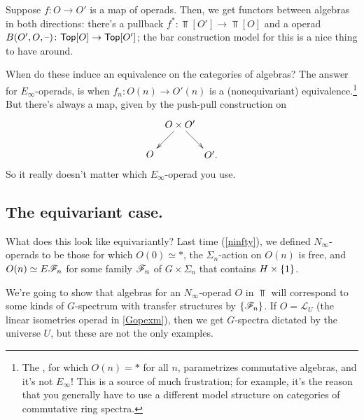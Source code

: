 Suppose $f\colon O\to O'$ is a map of operads. Then, we get functors between algebras in both directions: there's a
pullback $f^*\colon\Top[O']\to\Top[O]$ and a  operad $B(O',O,\text{--})\colon\mathsf{Top}[O]\to\mathsf{Top}[O']$;
the bar construction model for this is a nice thing to have around.

When do these induce an equivalence on the categories of algebras? The answer for $E_\infty$-operads,
is when $f_n\colon O(n)\to O'(n)$ is a (nonequivariant) equivalence.\footnote{The , for
which $O(n) = *$ for all $n$, parametrizes commutative algebras, and it's not $E_\infty$! This is a source of much
frustration; for example, it's the reason that you generally have to use a different model structure on categories
of commutative ring spectra.} But there's always a map, given by the push-pull construction on
\[\xymatrix@dr{
	O\times O'\ar[r]\ar[d] & O'.\\
	O
}\]
So it really doesn't matter which $E_\infty$-operad you use.
\subsection*{The equivariant case.} What does this look like equivariantly? Last time (\cref{ninfty}), we defined
$N_\infty$-operads to be those for which $O(0)\simeq *$, the $\Sigma_n$-action on $O(n)$ is free, and $O(n)\simeq
E\mathscr F_n$ for some family $\mathscr F_n$ of $G\times\Sigma_n$ that contains $H\times\{1\}$.

We're going to show that algebras for an $N_\infty$-operad $O$ in $\Top$ will correspond to some kinds of $G$-spectrum
with transfer structures by $\{\mathscr F_n\}$. If $O = \mathcal L_U$ (the linear isometries operad in \cref{Gopexm}),
then we get $G$-spectra dictated by the universe $U$, but these are not the only examples.

